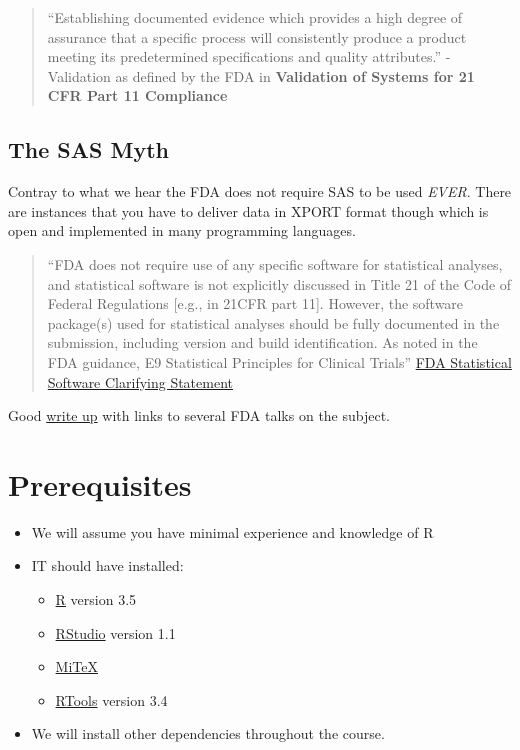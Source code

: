 \documentclass[]{book}
\providecommand{\tightlist}{%
  \setlength{\itemsep}{0pt}\setlength{\parskip}{0pt}}
\theoremstyle{definition}
\theoremstyle{definition}
\theoremstyle{definition}
\theoremstyle{remark}
\begin{document}
\begin{quote}
``Establishing documented evidence which provides a high degree of
assurance that a specific process will consistently produce a product
meeting its predetermined specifications and quality attributes.''
-Validation as defined by the FDA in \textbf{Validation of Systems for
21 CFR Part 11 Compliance}
\end{quote}

\subsection{The SAS Myth}\label{the-sas-myth}

Contray to what we hear the FDA does not require SAS to be used
\emph{EVER}. There are instances that you have to deliver data in XPORT
format though which is open and implemented in many programming
languages.

\begin{quote}
``FDA does not require use of any specific software for statistical
analyses, and statistical software is not explicitly discussed in Title
21 of the Code of Federal Regulations {[}e.g., in 21CFR part 11{]}.
However, the software package(s) used for statistical analyses should be
fully documented in the submission, including version and build
identification. As noted in the FDA guidance, E9 Statistical Principles
for Clinical Trials''
\href{https://www.fda.gov/downloads/forindustry/datastandards/studydatastandards/ucm587506.pdf}{FDA
Statistical Software Clarifying Statement}
\end{quote}

Good \href{http://blog.revolutionanalytics.com/2017/06/r-fda.html}{write
up} with links to several FDA talks on the subject.

\section{Prerequisites}\label{prerequisites}

\begin{itemize}
\tightlist
\item
  We will assume you have minimal experience and knowledge of R
\item
  IT should have installed:

  \begin{itemize}
  \tightlist
  \item
    \href{https://cran.r-project.org/}{R} version 3.5
  \item
    \href{https://www.rstudio.com/products/rstudio/download/\#download}{RStudio}
    version 1.1
  \item
    \href{https://miktex.org/}{MiTeX}
  \item
    \href{https://cran.r-project.org/bin/windows/Rtools/}{RTools}
    version 3.4
  \end{itemize}
\item
  We will install other dependencies throughout the course.
\end{itemize}
\end{document}
